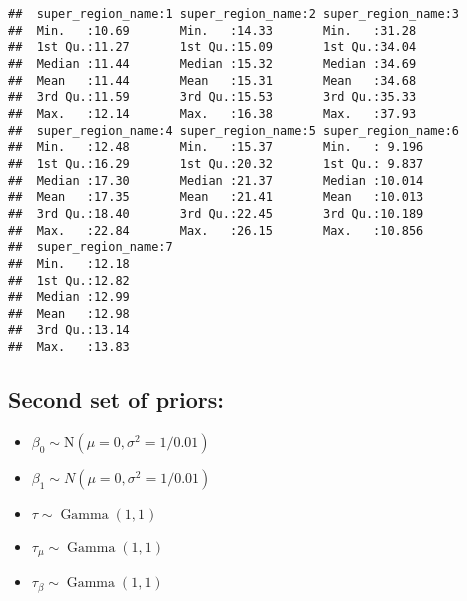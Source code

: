 \documentclass[
]{article}
\providecommand{\tightlist}{%
  \setlength{\itemsep}{0pt}\setlength{\parskip}{0pt}}
\begin{document}
\begin{verbatim}
##  super_region_name:1 super_region_name:2 super_region_name:3
##  Min.   :10.69       Min.   :14.33       Min.   :31.28      
##  1st Qu.:11.27       1st Qu.:15.09       1st Qu.:34.04      
##  Median :11.44       Median :15.32       Median :34.69      
##  Mean   :11.44       Mean   :15.31       Mean   :34.68      
##  3rd Qu.:11.59       3rd Qu.:15.53       3rd Qu.:35.33      
##  Max.   :12.14       Max.   :16.38       Max.   :37.93      
##  super_region_name:4 super_region_name:5 super_region_name:6
##  Min.   :12.48       Min.   :15.37       Min.   : 9.196     
##  1st Qu.:16.29       1st Qu.:20.32       1st Qu.: 9.837     
##  Median :17.30       Median :21.37       Median :10.014     
##  Mean   :17.35       Mean   :21.41       Mean   :10.013     
##  3rd Qu.:18.40       3rd Qu.:22.45       3rd Qu.:10.189     
##  Max.   :22.84       Max.   :26.15       Max.   :10.856     
##  super_region_name:7
##  Min.   :12.18      
##  1st Qu.:12.82      
##  Median :12.99      
##  Mean   :12.98      
##  3rd Qu.:13.14      
##  Max.   :13.83
\end{verbatim}

\hypertarget{second-set-of-priors}{%
\subsection{Second set of priors:}\label{second-set-of-priors}}

\begin{itemize}
\tightlist
\item
  \(\beta_0 \sim \mathrm{N}\left(\mu=0, \sigma^2=1 / 0.01\right)\)
\item
  \(\beta_1 \sim N\left(\mu=0, \sigma^2=1 / 0.01\right)\)
\item
  \(\tau \sim \operatorname{Gamma}(1,1)\)
\item
  \(\tau_\mu \sim \operatorname{Gamma}(1,1)\)
\item
  \(\tau_\beta \sim \operatorname{Gamma}(1,1)\)
\end{itemize}
\end{document}
